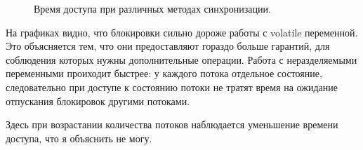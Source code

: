 \documentclass{article}
\begin{document}
\begin{figure}[ht]
{
    }
    \hfill
    \caption{Время доступа при различных методах синхронизации.}
\end{figure}

На графиках видно, что блокировки сильно дороже работы с volatile переменной.
Это объясняется тем, что они предоставляют гораздо больше гарантий, для соблюдения которых нужны дополнительные операции.
Работа с неразделяемыми переменными проиходит быстрее: у каждого потока отдельное состояние,
следовательно при доступе к состоянию потоки не тратят время на ожидание отпускания блокировок другими потоками.

Здесь при возрастании количества потоков наблюдается уменьшение времени доступа, что я объяснить не могу.
\end{document}
